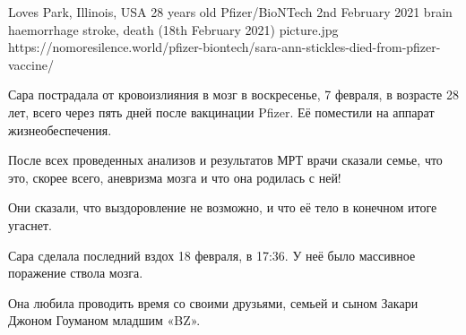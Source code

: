 {Loves Park, Illinois, USA}
{28 years old}
{Pfizer/BioNTech }
{2nd February 2021}
{brain haemorrhage stroke, death (18th February 2021)}
{picture.jpg}
{https://nomoresilence.world/pfizer-biontech/sara-ann-stickles-died-from-pfizer-vaccine/}
{

Сара пострадала от кровоизлияния в мозг в воскресенье, 7 февраля, в возрасте 28
лет, всего через пять дней после вакцинации Pfizer. Её поместили на аппарат
жизнеобеспечения.

После всех проведенных анализов и результатов МРТ врачи сказали семье, что это,
скорее всего, аневризма мозга и что она родилась с ней!

Они сказали, что выздоровление не возможно, и что её тело в конечном итоге
угаснет.

Сара сделала последний вздох 18 февраля, в 17:36. У неё было массивное поражение
ствола мозга.

Она любила проводить время со своими друзьями, семьей и сыном Закари Джоном
Гоуманом младшим «BZ».

}
